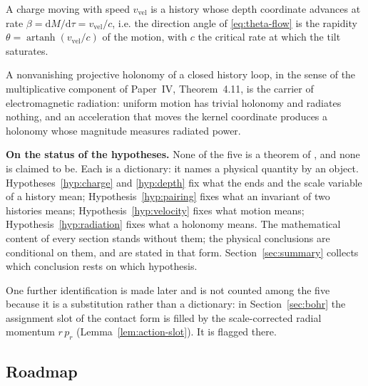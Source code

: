 \begin{hypothesis}
\label{hyp:velocity}
A charge moving with speed $v_{\mathrm{vel}}$ is a history whose depth coordinate
advances at rate $\beta=\mathrm dM/\mathrm d\tau=v_{\mathrm{vel}}/c$, i.e. the
direction angle of \eqref{eq:theta-flow} is the rapidity
$\theta=\operatorname{artanh}(v_{\mathrm{vel}}/c)$ of the motion, with $c$ the
critical rate at which the tilt saturates.
\end{hypothesis}

\begin{hypothesis}
\label{hyp:radiation}
A nonvanishing projective holonomy of a closed history loop, in the sense of the
multiplicative component of Paper~IV, Theorem~4.11, is the carrier of
electromagnetic radiation: uniform motion has trivial holonomy and radiates
nothing, and an acceleration that moves the kernel coordinate produces a
holonomy whose magnitude measures radiated power.
\end{hypothesis}

\begin{statusbox}
\textbf{On the status of the hypotheses.}  None of the five is a theorem of
\AEG{}, and none is claimed to be.  Each is a dictionary: it names a physical
quantity by an \AEG{} object.  Hypotheses~\ref{hyp:charge} and
\ref{hyp:depth} fix what the ends and the scale variable of a history mean;
Hypothesis~\ref{hyp:pairing} fixes what an invariant of two histories means;
Hypothesis~\ref{hyp:velocity} fixes what motion means;
Hypothesis~\ref{hyp:radiation} fixes what a holonomy means.  The mathematical
content of every section stands without them; the physical conclusions are
conditional on them, and are stated in that form.  Section~\ref{sec:summary}
collects which conclusion rests on which hypothesis.

One further identification is made later and is not counted among the five
because it is a substitution rather than a dictionary: in
Section~\ref{sec:bohr} the assignment slot of the contact form is filled by the
scale-corrected radial momentum $r\,p_r$ (Lemma~\ref{lem:action-slot}).  It is
flagged there.
\end{statusbox}

\subsection{Roadmap}

